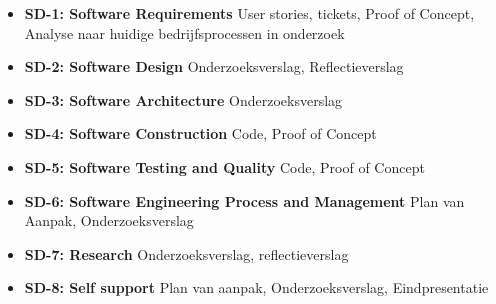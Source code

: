 \begin{itemize}
  \item \textbf{SD-1: Software Requirements} User stories, tickets, Proof of Concept, Analyse naar huidige bedrijfsprocessen in onderzoek
  \item \textbf{SD-2: Software Design} Onderzoeksverslag, Reflectieverslag
  \item \textbf{SD-3: Software Architecture} Onderzoeksverslag
  \item \textbf{SD-4: Software Construction} Code, Proof of Concept
  \item \textbf{SD-5: Software Testing and Quality} Code, Proof of Concept
  \item \textbf{SD-6: Software Engineering Process and Management}  Plan van Aanpak, Onderzoeksverslag
  \item \textbf{SD-7: Research} Onderzoeksverslag, reflectieverslag
  \item \textbf{SD-8: Self support} Plan van aanpak, Onderzoeksverslag, Eindpresentatie
\end{itemize}


